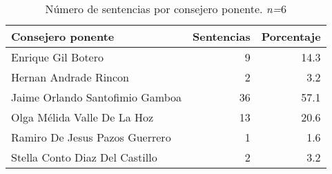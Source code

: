 \begin{table}[H]
\centering
\caption{Número de sentencias por consejero ponente. \textit{n=}6} 
\label{tab:consejero}
\begin{tabular}{lrr}
  \hline
Consejero ponente & Sentencias & Porcentaje \\ 
  \hline
Enrique Gil Botero &  9 & 14.3 \\ 
  Hernan Andrade Rincon &  2 & 3.2 \\ 
  Jaime Orlando Santofimio Gamboa & 36 & 57.1 \\ 
  Olga Mélida Valle De La Hoz & 13 & 20.6 \\ 
  Ramiro De Jesus Pazos Guerrero &  1 & 1.6 \\ 
  Stella Conto Diaz Del Castillo &  2 & 3.2 \\ 
   \hline
\end{tabular}
\end{table}
